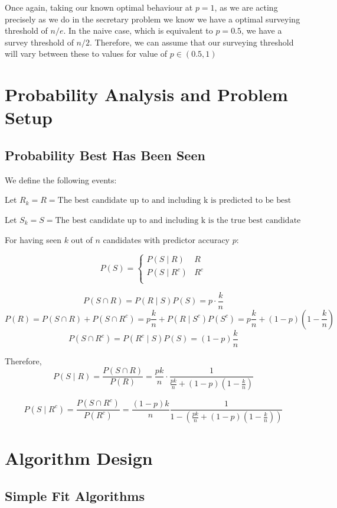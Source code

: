 \documentclass[a4paper,11pt]{article}
\begin{document}
Once again, taking our known optimal behaviour at $p = 1$, as we are acting precisely as we do in the secretary problem we know we have a optimal surveying threshold of $n/e$. In the naive case, which is equivalent to $p=0.5$, we have a survey threshold of $n/2$. Therefore, we can assume that our surveying threshold will vary between these to values for value of $p \in (0.5,1)$

\section{Probability Analysis and Problem Setup}



\subsection{Probability Best Has Been Seen}


We define the following events:

Let $R_k = R = \text{The best candidate up to and including k is predicted to be best}$ 

Let $S_k = S= \text{The best candidate up to and including k is the true best candidate}$ 

For having seen $k$ out of $n$ candidates with predictor accuracy $p$:

$$
P(S) = \begin{cases}
   P(S \mid R) & R\\
  P(S \mid R^c) & R^c\\
\end{cases}
$$


$$
P(S\cap R) = P(R \mid S)P(S) = p \cdot \frac{k}{n} 
$$
$$
P(R) = P(S\cap R) + P(S\cap R^c) = p\frac{k}{n} + P(R\mid S^c)P(S^c) = p\frac{k}{n} +\left(1-p\right)\left(1-\frac{k}{n}\right)
$$
$$
P(S\cap R^c) = P(R^c \mid S)P(S) = (1-p)\frac{k}{n} 
$$

Therefore,
$$
P(S \mid R) = \frac{P(S\cap R)}{P(R)} = \frac{pk}{n} \cdot \frac{1}{\frac{pk}{n}+(1-p)\left(1-\frac{k}{n}\right)}
$$

$$
P(S \mid R^c) = \frac{P(S\cap R^c)}{P(R^c)} = \frac{(1-p)k}{n}\frac{1}{1-(\frac{pk}{n}+(1-p)(1-\frac{k}{n}))}
$$

\section{Algorithm Design}
\label{sec:design}
\subsection{Simple Fit Algorithms}
\end{document}
